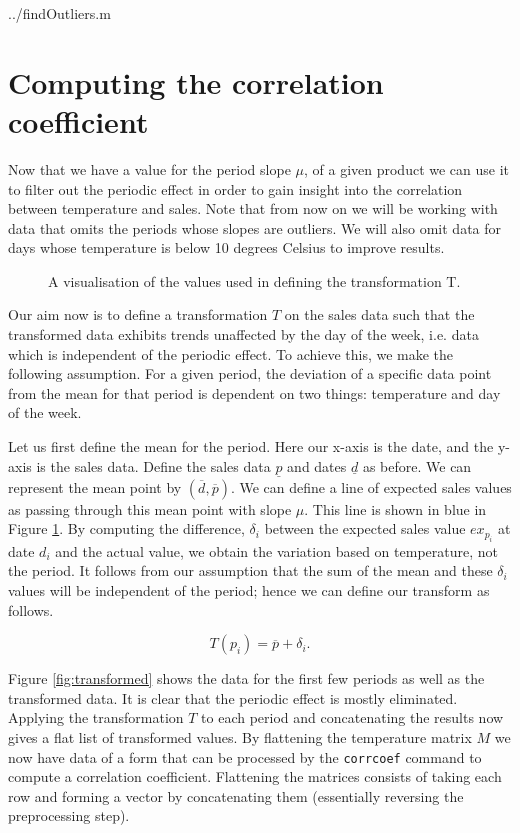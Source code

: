  {../findOutliers.m}

\section{Computing the correlation coefficient}

Now that we have a value for the period slope $\mu$, of a given product we can use it to filter out the periodic effect in order to gain insight into the correlation between temperature and sales. Note that from now on we will be working with data that omits the periods whose slopes are outliers. We will also omit data for days whose temperature is below 10 degrees Celsius to improve results.

\begin{figure}[h!]
\centering

\caption{A visualisation of the values used in defining the transformation T.}
\label{fig:slopestik}
\end{figure}

Our aim now is to define a transformation $T$ on the sales data such that the transformed data exhibits trends unaffected by the day of the week, i.e. data which is independent of the periodic effect. To achieve this, we make the following assumption. For a given period, the deviation of a specific data point from the mean for that period is dependent on two things: temperature and day of the week. 



Let us first define the mean for the period. Here our x-axis is the date, and the y-axis is the sales data. Define the sales data $\underline{p}$ and dates $\underline{d}$ as before. We can represent the mean point by $(\overline{d}, \overline{p})$. We can define a line of expected sales values as passing through this mean point with slope $\mu$. This line is shown in blue in Figure \ref{fig:slopestik}. By computing the difference, $\delta_i$ between the expected sales value $ex_{p_i}$ at date $d_i$ and the actual value, we obtain the variation based on temperature, not the period. It follows from our assumption that the sum of the mean and these $\delta_i$ values will be independent of the period; hence we can define our transform as follows.

$$ T(p_i) = \overline{p} + \delta_i .$$

Figure \ref{fig:transformed} shows the data for the first few periods as well as the transformed data. It is clear that the periodic effect is mostly eliminated. Applying the transformation $T$ to each period and concatenating the results now gives a flat list of transformed values. By flattening the temperature matrix $M$ we now have data of a form that can be processed by the \texttt{corrcoef} command to compute a correlation coefficient. Flattening the matrices consists of taking each row and forming a vector by concatenating them (essentially reversing the preprocessing step).

